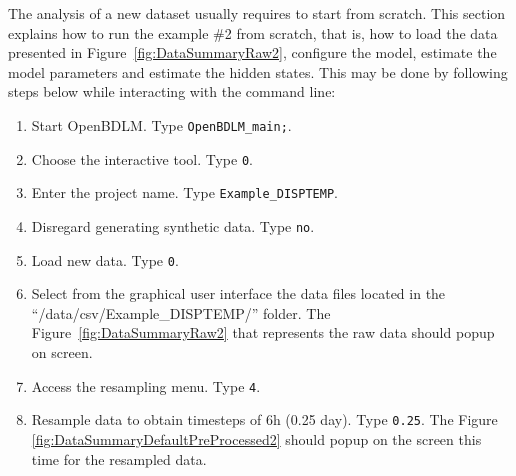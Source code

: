 The analysis of a new dataset usually requires to start from scratch.
This section explains how to run the example \#2 from scratch, that is, how to load the data presented in Figure~\ref{fig:DataSummaryRaw2}, configure the model, estimate the model parameters and estimate the hidden states.
This may be done by following steps below while interacting with the \MATLAB{} command line:
\begin{enumerate}
\item Start OpenBDLM. Type \colorbox{light-gray}{\lstinline[basicstyle = \mlttfamily \small, backgroundcolor = \color{light-gray}]!OpenBDLM_main;!}.
\item Choose the interactive tool. Type \colorbox{light-gray}{\lstinline[basicstyle = \mlttfamily \small, backgroundcolor = \color{light-gray}]!0!}.
\item Enter the project name. Type \colorbox{light-gray}{\lstinline[basicstyle = \mlttfamily \small, backgroundcolor = \color{light-gray}]!Example_DISPTEMP!}. 
\item Disregard generating synthetic data. Type \colorbox{light-gray}{\lstinline[basicstyle = \mlttfamily \small, backgroundcolor = \color{light-gray}]!no!}. 
\item Load new data. Type \colorbox{light-gray}{\lstinline[basicstyle = \mlttfamily \small, backgroundcolor = \color{light-gray}]!0!}.
\item Select from the graphical user interface the data files located in the ``/data/csv/Example\_DISPTEMP/'' folder. The Figure~\ref{fig:DataSummaryRaw2} that represents the raw data should popup on screen.
\item Access the resampling menu. Type \colorbox{light-gray}{\lstinline[basicstyle = \mlttfamily \small, backgroundcolor = \color{light-gray}]!4!}. 

\item Resample data to obtain timesteps of 6h (0.25 day). Type \colorbox{light-gray}{\lstinline[basicstyle = \mlttfamily \small, backgroundcolor = \color{light-gray}]!0.25!}. The Figure \ref{fig:DataSummaryDefaultPreProcessed2} should popup on the screen this time for the resampled data.


\end{enumerate}
